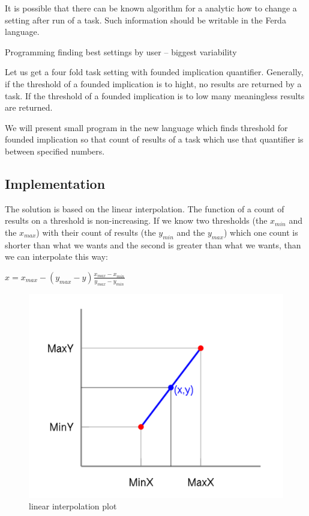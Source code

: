 \documentclass[a4paper,12pt]{book}
\begin{document}
It is possible that there can be known algorithm for a analytic how to change a setting after run of a task. Such information should be writable in the Ferda language.

Programming finding best settings by user -- biggest variability

Let us get a four fold task setting with founded implication quantifier. Generally, if the threshold of a founded implication is to hight, no results are returned by a task. If the threshold of a founded implication is to low many meaningless results are returned.

We will present small program in the new language which finds threshold for founded implication so that count of results of a task which use that quantifier is between specified numbers.

\subsection{Implementation}
The solution is based on the linear interpolation. The function of a count of results on a threshold is non-increasing. If we know two thresholds (the $x_{min}$ and the $x_{max}$) with their count of results (the $y_{min}$ and the $y_{max}$) which one count is shorter than what we wants and the second is greater than what we wants, than we can interpolate this way: 

\begin{math}
x = x_{max} - (y_{max} - y)\frac{x_{max} - x_{min}}{y_{max} - y_{min}}
\end{math}
\begin{figure}
	\includegraphics[width=1\textwidth]{linearInterpolationPlot}
	\caption{linear interpolation plot}
\end{figure}
\end{document}
